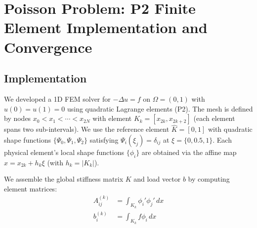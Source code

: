 \documentclass{article}
\begin{document}
\section{Poisson Problem: P2 Finite Element Implementation and Convergence}

\subsection{Implementation}
We developed a 1D FEM solver for $-\Delta u = f$ on $\Omega = (0,1)$ with $u(0)=u(1)=0$ using quadratic Lagrange elements (P2). The mesh is defined by nodes $x_0 < x_1 < \cdots < x_{2N}$ with element $K_k = [x_{2k}, x_{2k+2}]$ (each element spans two sub-intervals). We use the reference element $\hat K=[0,1]$ with quadratic shape functions $\{\Psi_0,\Psi_1,\Psi_2\}$ satisfying $\Psi_i(\xi_j)=\delta_{ij}$ at $\xi=\{0,0.5,1\}$. Each physical element's local shape functions $\{\phi_i\}$ are obtained via the affine map $x = x_{2k} + h_k\xi$ (with $h_k = |K_k|$).

We assemble the global stiffness matrix $K$ and load vector $b$ by computing element matrices:
\begin{align*}
A^{(k)}_{ij} &= \int_{K_k}\phi_{i}'\phi_{j}'\,dx \\
b^{(k)}_{i} &= \int_{K_k}f\phi_i\,dx
\end{align*}
\end{document}
